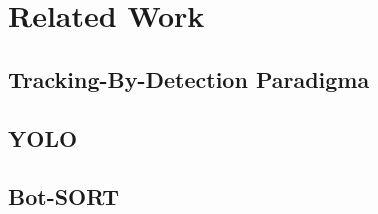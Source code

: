 \chapter{Related Work}

\section{Tracking-By-Detection Paradigma}

\section{YOLO}

\section{Bot-SORT}